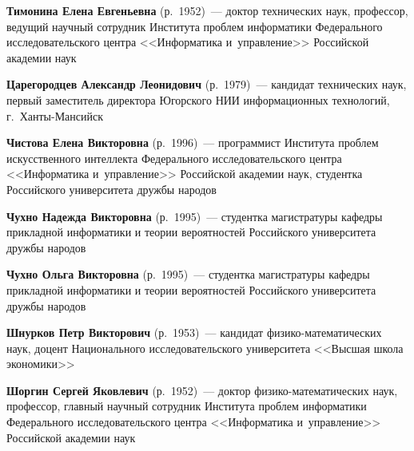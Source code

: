 \begin{multicols}{2}
\vspace*{3pt}

\noindent
\textbf{Тимонина Елена Евгеньевна} (р.\ 1952)~--- 
доктор технических наук, профессор, ведущий научный сотруд\-ник 
Института проб\-лем информатики Федерального исследовательского центра 
<<Информатика и~управ\-ле\-ние>> Российской академии наук

\vspace*{3pt}

\noindent
\textbf{Царегородцев Александр Леонидович} (р.\ 1979)~--- 
кандидат технических наук, первый заместитель  директора 
Югорского НИИ информационных технологий, г.~Хан\-ты-Ман\-сийск

\vspace*{3pt}

\noindent
\textbf{Чистова Елена Викторовна} (р.\ 1996)~--- программист Института проб\-лем 
искусственного интеллекта Федерального исследовательского центра <<Информатика 
и~управ\-ле\-ние>> Российской академии наук, студентка Российского университета дружбы
на\-родов


\pagebreak


\noindent
\textbf{Чухно Надежда Викторовна} (р.\ 1995)~--- 
студентка магистратуры кафедры прикладной информатики и теории вероятностей 
Российского университета дружбы народов

\vspace*{3pt}

\noindent
\textbf{Чухно Ольга Викторовна} (р.\ 1995)~--- 
студентка магистратуры кафедры прикладной информатики и теории вероятностей 
Российского университета дружбы народов

\vspace*{3pt}

\noindent
\textbf{Шнурков Петр Викторович} (р.\ 1953)~--- 
кандидат фи\-зи\-ко-ма\-те\-ма\-ти\-че\-ских наук, 
доцент Национального исследовательского университета <<Высшая школа экономики>>

\vspace*{3pt}

\noindent
\textbf{Шоргин Сергей Яковлевич} (р.\ 1952)~--- 
доктор фи\-зи\-ко-ма\-те\-ма\-ти\-че\-ских наук, профессор, главный научный 
сотрудник Института проб\-лем информатики Федерального исследовательского центра 
<<Информатика и~управ\-ле\-ние>> Российской академии наук

\vspace*{3pt}



\end{multicols}

